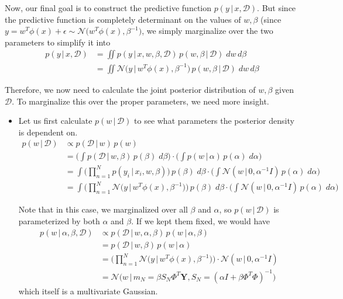   Now, our final goal is to construct the predictive function $p(y\,|\,x, \mathcal{D})$. But since the predictive function is completely determinant on the values of $w, \beta$ (since $y = w^T \phi(x) + \epsilon \sim \mathcal{N}\big( w^T \phi(x), \beta^{-1}\big)$, we simply marginalize over the two parameters to simplify it into
  \begin{align*}
    p(y\,|\,x, \mathcal{D}) & = \iint p(y\,|\, x, w, \beta, \mathcal{D}) \, p(w, \beta \,|\,\mathcal{D})\; dw\, d\beta \\
    & = \iint \mathcal{N}\big(y\,|\, w^T \phi(x), \beta^{-1}\big) \, p(w, \beta\,|\, \mathcal{D})\; dw\, d\beta
  \end{align*}

  Therefore, we now need to calculate the joint posterior distribution of $w, \beta$ given $\mathcal{D}$. To marginalize this over the proper parameters, we need more insight.
  \begin{itemize}
    \item Let us first calculate $p(w\,|\,\mathcal{D})$ to see what parameters the posterior density is dependent on.
    \begin{align*}
      p(w\,|\,\mathcal{D}) & \propto p(\mathcal{D} \,|\,w)\, p(w) \\
      & = \Bigg( \int p(\mathcal{D}\,|\,w, \beta) \, p( \beta) \; d\beta \Bigg) \cdot \Bigg( \int p(w\,|\,\alpha)\, p(\alpha)\; d\alpha \Bigg) \\
      & = \int \bigg( \prod_{n=1}^N p(y_i\,|\,x_i, w, \beta)\bigg)\, p(\beta) \; d\beta \cdot \Bigg( \int \mathcal{N}(w\,|\,0, \alpha^{-1} I)\, p(\alpha)\; d\alpha \Bigg) \\
      & = \int \bigg( \prod_{n=1}^N \mathcal{N}\big( y\,|\, w^T \phi(x), \beta^{-1} \big) \bigg)\, p(\beta) \; d\beta \cdot \Bigg( \int \mathcal{N}(w\,|\,0, \alpha^{-1} I)\, p(\alpha)\; d\alpha \Bigg)
    \end{align*}
    
    Note that in this case, we marginalized over all $\beta$ and $\alpha$, so $p(w\,|\,\mathcal{D})$ is parameterized by both $\alpha$ and $\beta$. If we kept them fixed, we would have
    \begin{align*}
      p(w\,|\,\alpha, \beta, \mathcal{D}) & \propto p(\mathcal{D}\,|\,w, \alpha, \beta) \, p(w\,|\,\alpha, \beta) \\
      & = p(\mathcal{D}\,|\,w, \beta) \, p(w\,|\,\alpha) \\
      & = \bigg( \prod_{n=1}^N \mathcal{N}\big( y\,|\, w^T \phi(x), \beta^{-1} \big) \bigg) \cdot \mathcal{N}(w\,|\,0, \alpha^{-1} I) \\
      & = \mathcal{N}\big( w\,|\, m_N = \beta S_N \Phi^T \mathbf{Y}, S_N = (\alpha I + \beta \Phi^T \Phi)^{-1} \big)
    \end{align*}
    which itself is a multivariate Gaussian.
  \end{itemize}

